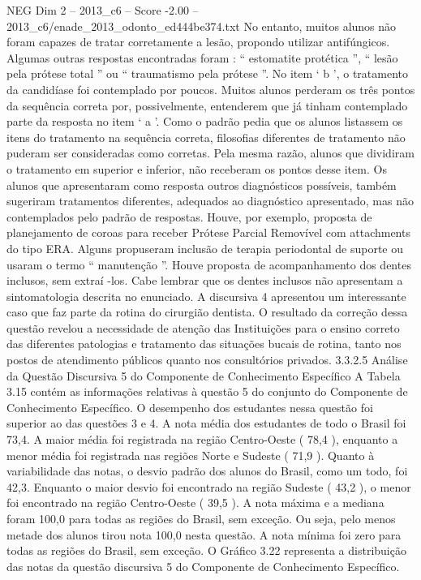 \begin{textsample}{NEG Dim 2 – 2013\_c6 – Score -2.00 – 2013\_c6/enade\_2013\_odonto\_ed444be374.txt}
No entanto, muitos alunos não foram capazes de tratar corretamente a lesão, propondo utilizar antifúngicos.
Algumas outras respostas encontradas foram : “ estomatite protética ”, “ lesão pela prótese total ” ou “ traumatismo pela prótese ”.
No item ‘ b ’, o tratamento da candidíase foi contemplado por poucos.
Muitos alunos perderam os três pontos da sequência correta por, possivelmente, entenderem que já tinham contemplado parte da resposta no item ‘ a ’.
Como o padrão pedia que os alunos listassem os itens do tratamento na sequência correta, filosofias diferentes de tratamento não puderam ser consideradas como corretas.
Pela mesma razão, alunos que dividiram o tratamento em superior e inferior, não receberam os pontos desse item.
Os alunos que apresentaram como resposta outros diagnósticos possíveis, também sugeriram tratamentos diferentes, adequados ao diagnóstico apresentado, mas não contemplados pelo padrão de respostas.
Houve, por exemplo, proposta de planejamento de coroas para receber Prótese Parcial Removível com attachments do tipo ERA.
Alguns propuseram inclusão de terapia periodontal de suporte ou usaram o termo “ manutenção ”.
Houve proposta de acompanhamento dos dentes inclusos, sem extraí -los.
Cabe lembrar que os dentes inclusos não apresentam a sintomatologia descrita no enunciado.
A discursiva 4 apresentou um interessante caso que faz parte da rotina do cirurgião dentista.
O resultado da correção dessa questão revelou a necessidade de atenção das Instituições para o ensino correto das diferentes patologias e tratamento das situações bucais de rotina, tanto nos postos de atendimento públicos quanto nos consultórios privados. 3.3.2.5 Análise da Questão Discursiva 5 do Componente de Conhecimento Específico A Tabela 3.15 contém as informações relativas à questão 5 do conjunto do Componente de Conhecimento Específico.
O desempenho dos estudantes nessa questão foi superior ao das questões 3 e 4.
A nota média dos estudantes de todo o Brasil foi 73,4.
A maior média foi registrada na região Centro-Oeste ( 78,4 ), enquanto a menor média foi registrada nas regiões Norte e Sudeste ( 71,9 ).
Quanto à variabilidade das notas, o desvio padrão dos alunos do Brasil, como um todo, foi 42,3.
Enquanto o maior desvio foi encontrado na região Sudeste ( 43,2 ), o menor foi encontrado na região Centro-Oeste ( 39,5 ).
A nota máxima e a mediana foram 100,0 para todas as regiões do Brasil, sem exceção.
Ou seja, pelo menos metade dos alunos tirou nota 100,0 nesta questão.
A nota mínima foi zero para todas as regiões do Brasil, sem exceção.
O Gráfico 3.22 representa a distribuição das notas da questão discursiva 5 do Componente de Conhecimento Específico.

\end{textsample}
